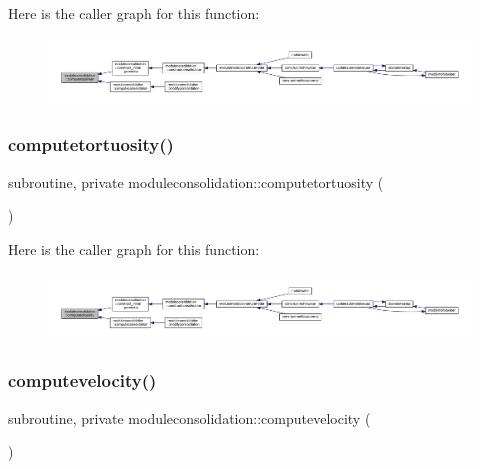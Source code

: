 Here is the caller graph for this function\+:\nopagebreak
\begin{figure}[H]
\begin{center}
\leavevmode
\includegraphics[width=350pt]{namespacemoduleconsolidation_a414e2c5a165b95dd5af3741e90f53de4_icgraph}
\end{center}
\end{figure}
\mbox{\label{namespacemoduleconsolidation_a3d7e2a533ad1c35b0dd1288ee25569b1}} 
\subsubsection{\texorpdfstring{computetortuosity()}{computetortuosity()}}
{\footnotesize\ttfamily subroutine, private moduleconsolidation\+::computetortuosity (\begin{DoxyParamCaption}{ }\end{DoxyParamCaption})\hspace{0.3cm}{\ttfamily [private]}}

Here is the caller graph for this function\+:\nopagebreak
\begin{figure}[H]
\begin{center}
\leavevmode
\includegraphics[width=350pt]{namespacemoduleconsolidation_a3d7e2a533ad1c35b0dd1288ee25569b1_icgraph}
\end{center}
\end{figure}
\mbox{\label{namespacemoduleconsolidation_a8045563d625e785b434b6daeaaf70a49}} 
\subsubsection{\texorpdfstring{computevelocity()}{computevelocity()}}
{\footnotesize\ttfamily subroutine, private moduleconsolidation\+::computevelocity (\begin{DoxyParamCaption}{ }\end{DoxyParamCaption})\hspace{0.3cm}{\ttfamily [private]}}

